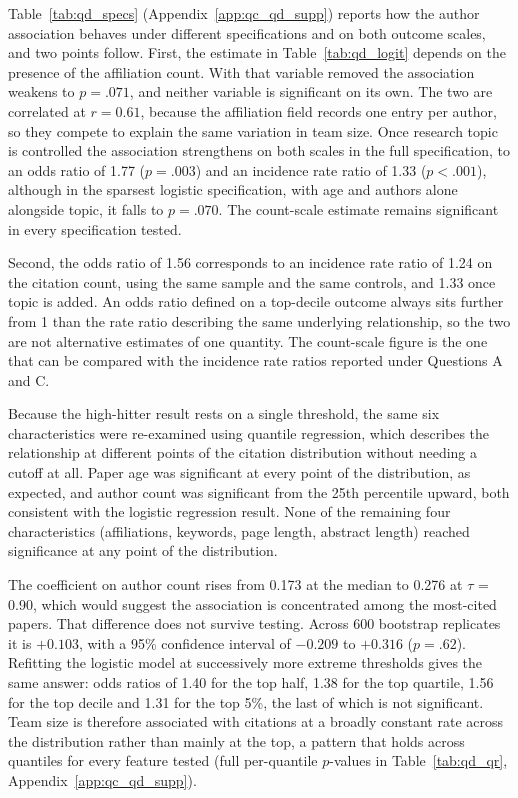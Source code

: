 \documentclass[11pt,a4paper]{article}
\begin{document}
Table~\ref{tab:qd_specs} (Appendix~\ref{app:qc_qd_supp}) reports how the author association behaves under different specifications and on both outcome scales, and two points follow. First, the estimate in Table~\ref{tab:qd_logit} depends on the presence of the affiliation count. With that variable removed the association weakens to $p = .071$, and neither variable is significant on its own. The two are correlated at $r = 0.61$, because the affiliation field records one entry per author, so they compete to explain the same variation in team size. Once research topic is controlled the association strengthens on both scales in the full specification, to an odds ratio of 1.77 ($p = .003$) and an incidence rate ratio of 1.33 ($p < .001$), although in the sparsest logistic specification, with age and authors alone alongside topic, it falls to $p = .070$. The count-scale estimate remains significant in every specification tested.

Second, the odds ratio of 1.56 corresponds to an incidence rate ratio of 1.24 on the citation count, using the same sample and the same controls, and 1.33 once topic is added. An odds ratio defined on a top-decile outcome always sits further from 1 than the rate ratio describing the same underlying relationship, so the two are not alternative estimates of one quantity. The count-scale figure is the one that can be compared with the incidence rate ratios reported under Questions A and C.

Because the high-hitter result rests on a single threshold, the same six characteristics were re-examined using quantile regression, which describes the relationship at different points of the citation distribution without needing a cutoff at all. Paper age was significant at every point of the distribution, as expected, and author count was significant from the 25th percentile upward, both consistent with the logistic regression result. None of the remaining four characteristics (affiliations, keywords, page length, abstract length) reached significance at any point of the distribution.

The coefficient on author count rises from 0.173 at the median to 0.276 at $\tau$ = 0.90, which would suggest the association is concentrated among the most-cited papers. That difference does not survive testing. Across 600 bootstrap replicates it is $+0.103$, with a 95\% confidence interval of $-0.209$ to $+0.316$ ($p = .62$). Refitting the logistic model at successively more extreme thresholds gives the same answer: odds ratios of 1.40 for the top half, 1.38 for the top quartile, 1.56 for the top decile and 1.31 for the top 5\%, the last of which is not significant. Team size is therefore associated with citations at a broadly constant rate across the distribution rather than mainly at the top, a pattern that holds across quantiles for every feature tested (full per-quantile $p$-values in Table~\ref{tab:qd_qr}, Appendix~\ref{app:qc_qd_supp}).
\end{document}
